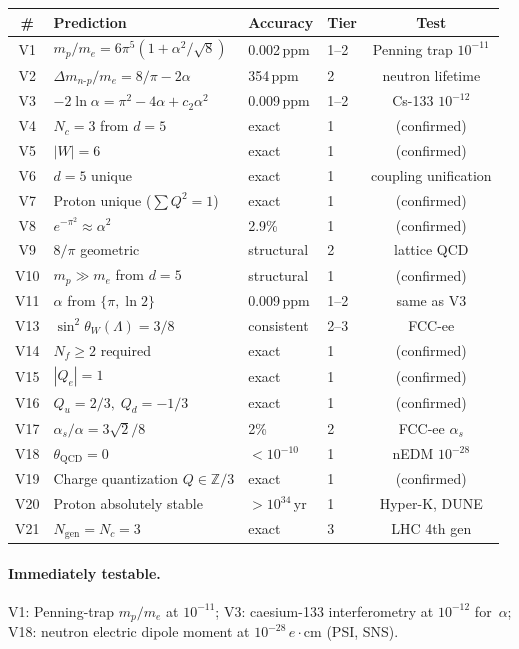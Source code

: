 \begin{center}
\renewcommand{\arraystretch}{1.15}
\small
\begin{tabular}{clllc}
\toprule
\# & Prediction & Accuracy & Tier & Test\\
\midrule
V1 & $m_p/m_e=6\pi^5(1+\alpha^2/\!\sqrt{8})$ & 0.002\,ppm & 1--2 & Penning trap $10^{-11}$\\
V2 & $\Delta m_{n\text{-}p}/m_e=8/\pi-2\alpha$ & 354\,ppm & 2 & neutron lifetime\\
V3 & $-2\ln\alpha=\pi^2-4\alpha+c_2\alpha^2$ & 0.009\,ppm & 1--2 & Cs-133 $10^{-12}$\\
V4 & $N_c=3$ from $d=5$ & exact & 1 & (confirmed)\\
V5 & $|W|=6$ & exact & 1 & (confirmed)\\
V6 & $d=5$ unique & exact & 1 & coupling unification\\
V7 & Proton unique ($\sum Q^2=1$) & exact & 1 & (confirmed)\\
V8 & $e^{-\pi^2}\approx\alpha^2$ & 2.9\% & 1 & (confirmed)\\
V9 & $8/\pi$ geometric & structural & 2 & lattice QCD\\
V10 & $m_p\gg m_e$ from $d=5$ & structural & 1 & (confirmed)\\
V11 & $\alpha$ from $\{\pi,\ln 2\}$ & 0.009\,ppm & 1--2 & same as V3\\
V13 & $\sin^2\theta_W(\Lambda)=3/8$ & consistent & 2--3 & FCC-ee\\
V14 & $N_f\geq 2$ required & exact & 1 & (confirmed)\\
V15 & $|Q_e|=1$ & exact & 1 & (confirmed)\\
V16 & $Q_u=2/3,\;Q_d=-1/3$ & exact & 1 & (confirmed)\\
V17 & $\alpha_s/\alpha=3\sqrt{2}/8$ & 2\% & 2 & FCC-ee $\alpha_s$\\
V18 & $\theta_{\mathrm{QCD}}=0$ & $<10^{-10}$ & 1 & nEDM $10^{-28}$\\
V19 & Charge quantization $Q\in\mathbb{Z}/3$ & exact & 1 & (confirmed)\\
V20 & Proton absolutely stable & $>10^{34}$\,yr & 1 & Hyper-K, DUNE\\
V21 & $N_{\mathrm{gen}}=N_c=3$ & exact & 3 & LHC 4th gen\\
\bottomrule
\end{tabular}
\label{tab:predictions}
\end{center}

\paragraph{Immediately testable.}
V1: Penning-trap $m_p/m_e$ at $10^{-11}$;
V3: caesium-133 interferometry at $10^{-12}$ for~$\alpha$;
V18: neutron electric dipole moment at $10^{-28}\,e\!\cdot\!\mathrm{cm}$
(PSI, SNS).

